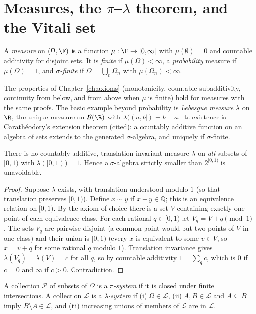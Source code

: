 \section{Measures, the $\pi$--$\lambda$ theorem, and the Vitali set}

\begin{definition}[Measure]
A \emph{measure} on $(\Omega,\F)$ is a function $\mu:\F\to[0,\infty]$ with
$\mu(\emptyset)=0$ and countable additivity for disjoint sets. It is \emph{finite} if
$\mu(\Omega)<\infty$, a \emph{probability} measure if $\mu(\Omega)=1$, and
\emph{$\sigma$-finite} if $\Omega=\bigcup_n\Omega_n$ with $\mu(\Omega_n)<\infty$.
\end{definition}

The properties of Chapter~\ref{ch:axioms} (monotonicity, countable subadditivity,
continuity from below, and from above when $\mu$ is finite) hold for measures with the same
proofs. The basic example beyond probability is \emph{Lebesgue measure} $\lambda$ on
$\R$, the unique measure on $\mathcal B(\R)$ with $\lambda((a,b])=b-a$. Its existence is
Carath\'eodory's extension theorem (cited): a countably additive function on an algebra of
sets extends to the generated $\sigma$-algebra, and uniquely if $\sigma$-finite.

\begin{theorem}\label{thm:vitali}
There is no countably additive, translation-invariant measure $\lambda$ on \emph{all}
subsets of $[0,1)$ with $\lambda([0,1))=1$. Hence a $\sigma$-algebra strictly smaller than
$2^{[0,1)}$ is unavoidable.
\end{theorem}
\begin{proof}
Suppose $\lambda$ exists, with translation understood modulo $1$ (so that translation
preserves $[0,1)$). Define $x\sim y$ if $x-y\in\mathbb Q$; this is an equivalence relation on
$[0,1)$. By the axiom of choice there is a set $V$ containing exactly one point of each
equivalence class. For each rational $q\in[0,1)$ let $V_q=V+q\pmod1$. The sets $V_q$ are
pairwise disjoint (a common point would put two points of $V$ in one class) and their union
is $[0,1)$ (every $x$ is equivalent to some $v\in V$, so $x=v+q$ for some rational
$q$ modulo $1$). Translation invariance gives $\lambda(V_q)=\lambda(V)=c$ for all $q$, so by
countable additivity $1=\sum_{q}c$, which is $0$ if $c=0$ and $\infty$ if $c>0$. Contradiction.
\end{proof}

\begin{definition}
A collection $\mathcal P$ of subsets of $\Omega$ is a \emph{$\pi$-system} if it is closed
under finite intersections. A collection $\mathcal L$ is a \emph{$\lambda$-system} if
(i) $\Omega\in\mathcal L$, (ii) $A,B\in\mathcal L$ and $A\subseteq B$ imply $B\setminus A\in\mathcal L$,
and (iii) increasing unions of members of $\mathcal L$ are in $\mathcal L$.
\end{definition}

